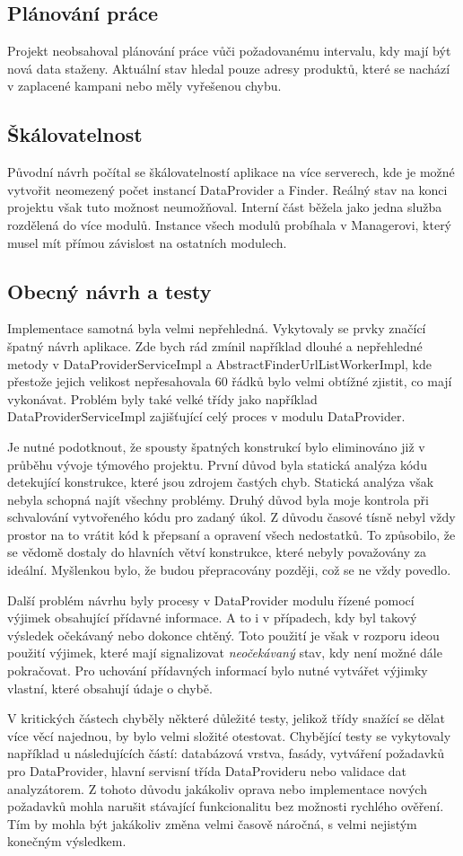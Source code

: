 \documentclass[thesis=B,czech]{FITthesis}[2012/06/26]
\begin{document}
\subsection{Plánování práce}
Projekt neobsahoval plánování práce vůči požadovanému intervalu, kdy mají být nová data
staženy. Aktuální stav hledal pouze adresy produktů, které se nachází v zaplacené kampani nebo měly vyřešenou chybu.
\subsection{Škálovatelnost}
Původní návrh počítal se škálovatelností aplikace na více serverech, kde je možné vytvořit neomezený počet instancí DataProvider a Finder. Reálný stav na konci projektu však tuto možnost neumožňoval. Interní část běžela jako jedna služba rozdělená do více modulů. 
Instance všech modulů probíhala v Managerovi, který musel mít přímou závislost na ostatních modulech.
\subsection{Obecný návrh a testy}\label{ch:architecture-tests}
Implementace samotná byla velmi nepřehledná. Vykytovaly se prvky značící špatný návrh aplikace.
Zde bych rád zmínil například dlouhé a nepřehledné metody v
DataProviderServiceImpl a AbstractFinderUrlListWorkerImpl, kde přestože jejich velikost 
nepřesahovala 60 řádků bylo velmi obtížné zjistit, co mají vykonávat. Problém byly také velké třídy
jako například DataProviderServiceImpl zajišťující celý proces v modulu DataProvider.
\par
Je nutné podotknout, že spousty špatných konstrukcí bylo eliminováno již v průběhu vývoje týmového projektu.
První důvod byla statická analýza kódu detekující konstrukce, které jsou zdrojem častých chyb. Statická analýza
však nebyla schopná najít všechny problémy. Druhý důvod byla moje kontrola při schvalování vytvořeného kódu pro 
zadaný úkol. Z důvodu časové tísně nebyl vždy prostor na to vrátit kód k přepsaní a opravení všech nedostatků. To způsobilo, že
se vědomě dostaly do hlavních větví konstrukce, které nebyly považovány za ideální. Myšlenkou bylo, že budou přepracovány později, což se ne vždy povedlo.
\par
Další problém návrhu byly procesy v DataProvider modulu řízené pomocí výjimek obsahující 
přídavné informace. A to i v případech, kdy byl takový výsledek očekávaný nebo dokonce chtěný. 
Toto použití je však v rozporu ideou použití výjimek, které mají signalizovat \textit{neočekávaný} stav, kdy není možné dále pokračovat.\cite{exception}
Pro uchování přídavných informací bylo nutné vytvářet výjimky vlastní, které obsahují údaje o chybě.
\par
V kritických částech chyběly některé důležité testy, jelikož třídy snažící se dělat více věcí najednou, by bylo velmi
složité otestovat. Chybějící testy se vykytovaly například u následujících částí: databázová vrstva, fasády, vytváření požadavků pro DataProvider,
hlavní servisní třída DataProvideru nebo validace dat analyzátorem. Z tohoto důvodu jakákoliv oprava nebo implementace nových požadavků 
mohla narušit stávající funkcionalitu bez možnosti rychlého ověření. Tím by mohla být jakákoliv změna velmi časově náročná, s velmi nejistým konečným výsledkem.
\end{document}
